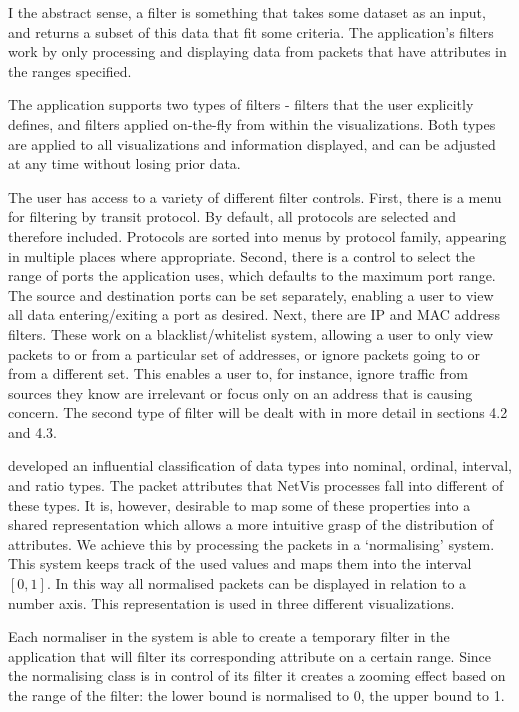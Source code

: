 I the abstract sense, a filter is something that takes some dataset as an input, and returns a subset of this data that fit some criteria.  The application's filters work by only processing and displaying data from packets that have attributes in the ranges specified.

The application supports two types of filters - filters that the user explicitly defines, and filters applied on-the-fly from within the visualizations.
Both types are applied to all visualizations and information displayed, and can be adjusted at any time without losing prior data.

The user has access to a variety of different filter controls.  First, there is a menu for filtering by transit protocol. By default, all protocols are selected and therefore included. Protocols are sorted into menus by protocol family, appearing in multiple places where appropriate. Second, there is a control to select the range of ports the application uses, which defaults to the maximum port range.  The source and destination ports can be set separately, enabling a user to view all data entering/exiting a port as desired.  Next, there are IP and MAC address filters.  These work on a blacklist/whitelist system, allowing a user to only view packets to or from a particular set of addresses, or ignore packets going to or from a different set.  This enables a user to, for instance, ignore traffic from sources they know are irrelevant or focus only on an address that is causing concern.
The second type of filter will be dealt with in more detail in sections 4.2 and 4.3.

\cite{stevens1946theory} developed an influential classification of data types into nominal, ordinal, interval, and ratio types. The packet attributes that NetVis processes fall into different of these types. It is, however, desirable to map some of these properties into a shared representation which allows a more intuitive grasp of the distribution of attributes. We achieve this by processing the packets in a `normalising' system. This system keeps track of the used values and maps them into the interval $[0,1]$. In this way all normalised packets can be displayed in relation to a number axis. This representation is used in three different visualizations.

Each normaliser in the system is able to create a temporary filter in the application that will filter its corresponding attribute on a certain range.
Since the normalising class is in control of its filter it creates a zooming effect based on the range of the filter: the lower bound is normalised to 0, the upper bound to 1. 


